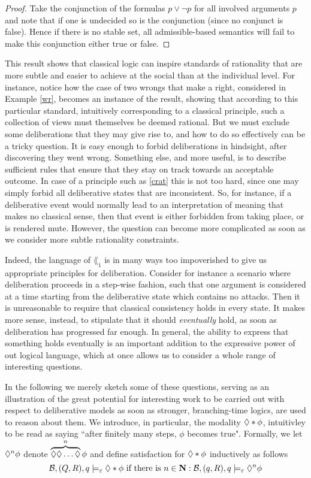 \documentclass[greybox]{svmult}
\newcommand{\views}{\mathcal B}
\newcommand{\sem}{\varepsilon}
\begin{document}
\begin{proof}
Take the conjunction of the formulas $p \lor \neg p$ for all involved arguments $p$ and note that if one is undecided so is the conjunction (since no conjunct is false). Hence if there is no stable set, all admissible-based semantics will fail to make this conjunction either true or false.
\end{proof}

This result shows that classical logic can inspire standards of rationality that are more subtle and easier to achieve at the social than at the individual level. For instance, notice how the case of two wrongs that make a right, considered in Example \ref{wr}, becomes an instance of the result, showing that according to this particular standard, intuitively corresponding to a classical principle, such a collection of views must themselves be deemed rational. But we must exclude some deliberations that they may give rise to, and how to do so effectively can be a tricky question. It is easy enough to forbid deliberations in hindsight, after discovering they went wrong. Something else, and more useful, is to describe sufficient rules that ensure that they stay on track towards an acceptable outcome. In case of a principle such as \ref{crat} this is not too hard, since one may simply forbid all deliberative states that are inconsistent. So, for instance, if a deliberative event would normally lead to an interpretation of meaning that makes no classical sense, then that event is either forbidden from taking place, or is rendered mute. However, the question can become more complicated as soon as we consider more subtle rationality constraints.

Indeed, the language of $\lang_1$ is in many ways too impoverished to give us appropriate principles for deliberation. Consider for instance a scenario where deliberation proceeds in a step-wise fashion, such that one argument is considered at a time starting from the deliberative state which contains no attacks. Then it is unreasonable to require that classical consistency holds in every state. It makes more sense, instead, to stipulate that it should \emph{eventually} hold, as soon as deliberation has progressed far enough. In general, the ability to express that something holds eventually is an important addition to the expressive power of out logical language, which at once allows us to consider a whole range of interesting questions.

In the following we merely sketch some of these questions, serving as an illustration of the great potential for interesting work to be carried out with respect to deliberative models as soon as stronger, branching-time logics, are used to reason about them. We introduce, in particular, the modality $\lozenge* \phi$, intuitivley to be read as saying ``after finitely many steps, $\phi$ becomes true". Formally, we let $\lozenge^n \phi$ denote $\overbrace{\lozenge \lozenge \ldots \lozenge}^{n} \phi$ and define satisfaction for $\lozenge* \phi$ inductively as follows
\begin{equation}\label{sem:star}
\views,(Q,R),q \models_\sem \adia*\phi \text{ if there is } n \in \mathbf N: \views,(q,R),q\models_\sem \adia^n \phi
\end{equation}
\end{document}
